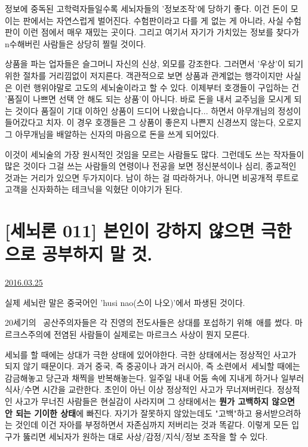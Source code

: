 정보에 중독된 고학력자들일수록 세뇌자들의 '정보조작'에 당하기 좋다.
이건 돈이 모이는 판에서는 자연스럽게 벌어진다. 수험판이라고 다를 게 없는 게 아니라, 사실 수험판이 이런 점에서 매우 재밌는 곳이다.
그리고 여기서 자기가 가치있는 정보를 찾다가 n수해버린 사람들은 상당히 찔릴 것이다.
\vspace{5mm}

상품을 파는 업자들은 슬그머니 자신의 신상, 외모를 강조한다. 그러면서 '우상'이 되기 위한 절차를 거리낌없이 저지른다.
객관적으로 보면 상품과 관계없는 행각이지만 사실은 이런 행위야말로 고도의 세뇌술이라고 할 수 있다.
이제부터 호갱들이 구입하는 건 '품질이 나쁘면 선택 안 해도 되는 상품'이 아니다. 바로 돈을 내서 교주님을 모시게 되는 것이다
품질이 기대 이하인 상품이 드디어 나왔습니다... 하면서 아무개님의 정성이 들어갔다고 치자.
이 경우 호갱들은 그 상품이 좋은지 나쁜지 신경쓰지 않는다, 오로지 그 아무개님을 배알하는 신자의 마음으로 돈을 쓰게 되어있다.
\vspace{5mm}

이것이 세뇌술의 가장 원시적인 것임을 모르는 사람들도 많다. 그런데도 쓰는 작자들이 많은 것이다
그걸 쓰는 사람들의 연령이나 전공을 보면 정신분석이나 심리, 종교적인 것과는 거리가 있으면 두가지이다.
남이 하는 걸 따라하거나, 아니면 비공개적 루트로 고객을 신자화하는 테크닉을 익혔단 이야기가 된다.
\vspace{5mm}






\section{[세뇌론 011] 본인이 강하지 않으면 극한으로 공부하지 말 것.}
\href{https://www.kockoc.com/Apoc/694274}{2016.03.25}

\vspace{5mm}

실제 세뇌란 말은 중국어인 'husi nao(스이 나오)'에서 파생된 것이다.
\vspace{5mm}

20세기의  공산주의자들은 각 진영의 전도사들은 상대를 포섭하기 위해 애를 썼다.
마르크스주의에 전염된 사람들이 실제로는 마르크스 사상이 뭔지 모른다.
\vspace{5mm}

세뇌를 할 때에는 상대가 극한 상태에 있어야한다. 극한 상태에서는 정상적인 사고가 되지 않기 때문이다.
과거 중국, 즉 중공이나 과거 러시아, 즉 소련에서 세뇌할 때에는 감금해놓고 당근과 채찍을 반복해놓는다.
일주일 내내 어둠 속에 지내게 하거나 일부러 식사/수면 시간을 교란한다. 초인이 아닌 이상 정상적인 사고가 무너져버린다.
정상적인 사고가 무너진 사람들은 현실감이 사라지며
그 상태에서는 \textbf{뭔가 고백하지 않으면 안 되는 기이한 상태}에 빠진다.
자기가 잘못하지 않았는데도 "고백"하고 용서받으려하는 것인데 이건 자아를 부정하면서 자존심까지 저버리는 것과 똑같다.
이렇게 모든 입구가 뚫리면 세뇌자가 원하는 대로 사상/감정/지식/정보 조작을 할 수 있다.
\vspace{5mm}

